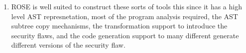 \begin{enumerate}
   \item ROSE is well suited to construct these sorts of tools this since it has a high
         level AST represnetation, most of the program analysis required, the AST subtree
         copy mechanisms, the transformation support to introduce the security flaws, and 
         the code generation support to many different generate different versions of
         the security flaw.

\end{enumerate}

